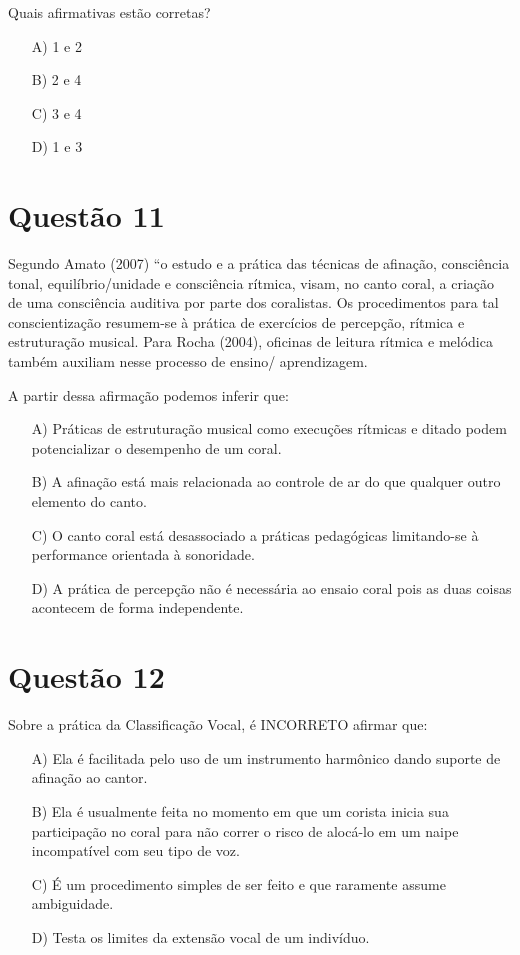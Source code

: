 \documentclass[a4paper, 12pt, openright, oneside, english, brazil, article]{abntex2}
\begin{document}
	Quais afirmativas estão corretas?
	
	\begin{enumerate}
		\item [A)] 1 e 2
		\item [B)] 2 e 4
		\item [C)] 3 e 4
		\item [D)] 1 e 3
	\end{enumerate}
	
	
	\section{Questão 11}
	
	Segundo Amato (2007) ``o estudo e a prática das técnicas de afinação, consciência tonal, equilíbrio/unidade e consciência rítmica, visam, no canto coral, a criação de uma consciência	auditiva por parte dos coralistas. Os procedimentos para tal conscientização resumem-se à prática de exercícios de percepção, rítmica e estruturação musical. Para Rocha (2004), oficinas de leitura rítmica e melódica também auxiliam nesse processo de ensino/ aprendizagem.
	
	A partir dessa afirmação podemos inferir que:
	
	\begin{enumerate}
		\item [A)] Práticas de estruturação musical como execuções rítmicas e ditado podem potencializar o desempenho de um coral.
		\item [B)] A afinação está mais relacionada ao controle de ar do que qualquer outro elemento do canto.
		\item [C)] O canto coral está desassociado a práticas pedagógicas limitando-se à performance orientada à sonoridade.
		\item [D)] A prática de percepção não é necessária ao ensaio coral pois as duas coisas acontecem de forma independente.
	\end{enumerate}
	
	
	\section{Questão 12}
	
	Sobre a prática da Classificação Vocal, é INCORRETO afirmar que:
	
	\begin{enumerate}
		\item [A)] Ela é facilitada pelo uso de um instrumento harmônico dando suporte de afinação ao cantor.
		\item [B)] Ela é usualmente feita no momento em que um corista inicia sua participação no coral para não correr o risco de alocá-lo em um naipe incompatível com seu tipo de voz.
		\item [C)] É um procedimento simples de ser feito e que raramente assume ambiguidade.
		\item [D)] Testa os limites da extensão vocal de um indivíduo.
	\end{enumerate}
	
\end{document}

